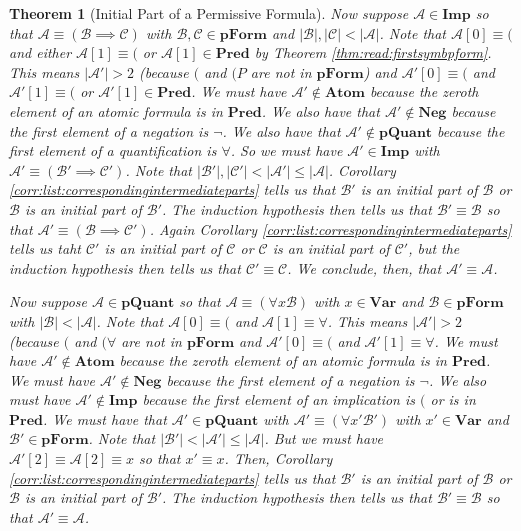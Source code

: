 \documentclass[12pt]{article}
\theoremstyle{break}
\theoremstyle{break}
\newtheorem{theorem}{Theorem}[section]
\theoremstyle{break}
\theoremstyle{break}
\theoremstyle{break}
\newtheorem{informal definition}[definition]{Informal Definition}
\newcommand{\mc}[1]{\mathcal{#1}}
\begin{document}
\begin{theorem}[Initial Part of a Permissive Formula]
Now suppose $\mc{A}\in\textbf{Imp}$ so that $\mc{A}\equiv (\mc{B}\implies \mc{C})$ with $\mc{B}, \mc{C}\in\textbf{pForm}$ and $|\mc{B}|, |\mc{C}|<|\mc{A}|$.
Note that $\mc{A}[0]\equiv ($ and either $\mc{A}[1]\equiv ($ or $\mc{A}[1] \in\textbf{Pred}$ by Theorem \ref{thm:read:firstsymbpform}.
This means $|\mc{A}'|>2$ (because $($ and $(P$ are not in $\textbf{pForm}$) and $\mc{A}'[0] \equiv ($ and $\mc{A}'[1] \equiv ($ or $\mc{A}'[1] \in \textbf{Pred}$.
We must have $\mc{A}'\not\in\textbf{Atom}$ because the zeroth element of an atomic formula is in $\textbf{Pred}$.
We also have that $\mc{A}'\not\in\textbf{Neg}$ because the first element of a negation is $\lnot$.
We also have that $\mc{A}'\not\in\textbf{pQuant}$ because the first element of a quantification is $\forall$.
So we must have $\mc{A}'\in\textbf{Imp}$ with $\mc{A}'\equiv (\mc{B}'\implies \mc{C}')$.
Note that $|\mc{B}'|,|\mc{C}'| < |\mc{A}'| \le |\mc{A}|$.
Corollary \ref{corr:list:correspondingintermediateparts} tells us that $\mc{B}'$ is an initial part of $\mc{B}$ or $\mc{B}$ is an initial part of $\mc{B}'$.
The induction hypothesis then tells us that $\mc{B}'\equiv \mc{B}$ so that $\mc{A}'\equiv (\mc{B}\implies \mc{C}')$.
Again Corollary \ref{corr:list:correspondingintermediateparts} tells us taht $\mc{C}'$ is an initial part of $\mc{C}$ or $\mc{C}$ is an initial part of $\mc{C}'$, but the induction hypothesis then tells us that $\mc{C}'\equiv \mc{C}$.
We conclude, then, that $\mc{A}'\equiv \mc{A}$.

Now suppose $\mc{A}\in\textbf{pQuant}$ so that $\mc{A}\equiv (\forall x \mc{B})$ with $x\in\textbf{Var}$ and $\mc{B}\in\textbf{pForm}$ with $|\mc{B}|<|\mc{A}|$.
Note that $\mc{A}[0]\equiv ($ and $\mc{A}[1]\equiv \forall$.
This means $|\mc{A}'|>2$ (because $($ and $(\forall$ are not in $\textbf{pForm}$ and $\mc{A}'[0]\equiv ($ and $\mc{A}'[1]\equiv \forall$.
We must have $\mc{A}'\not\in\textbf{Atom}$ because the zeroth element of an atomic formula is in $\textbf{Pred}$.
We must have $\mc{A}'\not\in\textbf{Neg}$ because the first element of a negation is $\lnot$.
We also must have $\mc{A}'\not\in\textbf{Imp}$ because the first element of an implication is $($ or is in $\textbf{Pred}$.
We must have that $\mc{A}'\in\textbf{pQuant}$ with $\mc{A}'\equiv (\forall x' \mc{B}')$ with $x'\in\textbf{Var}$ and $\mc{B}'\in\textbf{pForm}$.
Note that $|\mc{B}'|<|\mc{A}'| \le |\mc{A}|$.
But we must have $\mc{A}'[2] \equiv \mc{A}[2] \equiv x$ so that $x'\equiv x$.
Then, Corollary \ref{corr:list:correspondingintermediateparts} tells us that $\mc{B}'$ is an initial part of $\mc{B}$ or $\mc{B}$ is an initial part of $\mc{B}'$.
The induction hypothesis then tells us that $\mc{B}'\equiv \mc{B}$ so that $\mc{A}'\equiv \mc{A}$.
\end{theorem}
\end{document}
